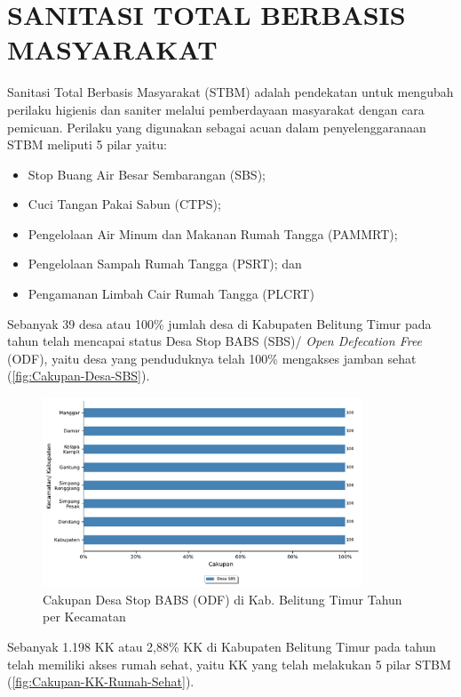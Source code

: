\section{SANITASI TOTAL BERBASIS MASYARAKAT}
Sanitasi Total Berbasis Masyarakat (STBM) adalah pendekatan untuk mengubah perilaku higienis dan saniter melalui pemberdayaan masyarakat dengan cara pemicuan. 
Perilaku yang digunakan sebagai acuan dalam penyelenggaranaan STBM meliputi 5 pilar yaitu:
\begin{itemize}
	\item Stop Buang Air Besar Sembarangan (SBS);
	\item Cuci Tangan Pakai Sabun (CTPS);
	\item Pengelolaan Air Minum dan Makanan Rumah Tangga (PAMMRT);
	\item Pengelolaan Sampah Rumah Tangga (PSRT); dan
	\item Pengamanan Limbah Cair Rumah Tangga (PLCRT)
\end{itemize} 

Sebanyak 39 desa atau 100\% jumlah desa di Kabupaten Belitung Timur pada tahun \tP telah mencapai status Desa Stop BABS (SBS)/ \emph{Open Defecation Free} (ODF), yaitu desa yang penduduknya telah 100\% mengakses jamban sehat (\autoref{fig:Cakupan-Desa-SBS}).

\begin{figure}[H]
    \centering
    \includegraphics[width=0.85\textwidth]{bab_07/bab_07_03a_desaSBS}
    \caption{Cakupan Desa Stop BABS (ODF) di Kab. Belitung Timur Tahun \tP per Kecamatan}
    \label{fig:Cakupan-Desa-SBS}
\end{figure}

Sebanyak 1.198 KK atau 2,88\% KK di Kabupaten Belitung Timur pada tahun \tP telah memiliki akses rumah sehat, yaitu KK yang telah melakukan 5 pilar STBM (\autoref{fig:Cakupan-KK-Rumah-Sehat}).

